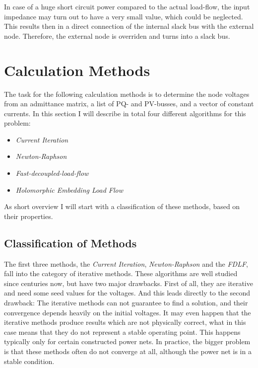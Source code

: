 In case of a huge short circuit power compared to the actual load-flow, the input impedance may turn out to have a very small value, which could be neglected. This results then in a direct connection of the internal slack bus with the external node. Therefore, the external node is overriden and turns into a slack bus.

\section{Calculation Methods}
\label{sec:calculation_methods}

The task for the following calculation methods is to determine the node voltages from an admittance matrix, a list of PQ- and PV-busses, and a vector of constant currents. In this section I will describe in total four different algorithms for this problem:
\begin{itemize}
	\item \emph{Current Iteration} \citep[p. 209]{powerSystemAnalysis}
	\item \emph{Newton-Raphson} \citep[p. 232]{powerSystemAnalysis}
	\item \emph{Fast-decoupled-load-flow} \citep[p. 240]{powerSystemAnalysis}
	\item \emph{Holomorphic Embedding Load Flow} \citep{helmIEEE, helmPatentApr2009, helmPatentSept2009}
\end{itemize}

As short overview I will start with a classification of these methods, based on their properties.

\subsection{Classification of Methods}

The first three methods, the \emph{Current Iteration}, \emph{Newton-Raphson} and the \emph{FDLF}, fall into the category of iterative methods. These algorithms are well studied since centuries now, but have two major drawbacks. First of all, they are iterative and need some seed values for the voltages. And this leads directly to the second drawback: The iterative methods can not guarantee to find a solution, and their convergence depends heavily on the initial voltages. It may even happen that the iterative methods produce results which are not physically correct, what in this case means that they do not represent a stable operating point. This happens typically only for certain constructed power nets. In practice, the bigger problem is that these methods often do not converge at all, although the power net is in a stable condition.

